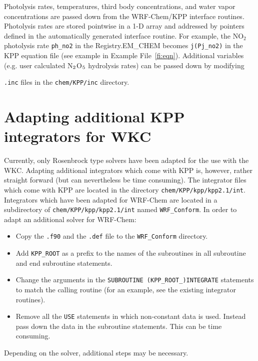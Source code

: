 \documentclass[twoside, 12pt, letterpaper]{article}
\begin{document}
Photolysis rates, temperatures, third body concentrations, and water vapor concentrations are passed down from the WRF-Chem/KPP interface routines. Photolysis rates are stored pointwise in a 1-D array and addressed by pointers defined in the automatically generated interface routine. For example, the NO$_2$ photolysis rate {\tt ph\_no2} in the Registry.EM\_CHEM becomes {\tt j(Pj\_no2)} in the KPP equation file (see example in Example File~\ref{fi:eqn}).
Additional variables (e.g. user calculated N$\rm_2$O$\rm_5$ hydrolysis rates) can be passed down by modifying {{\tt .inc} files in the {\tt chem/KPP/inc} directory.






\section{Adapting additional KPP integrators for WKC}\label{sec:add_int}
Currently, only Rosenbrock type solvers have been adapted for the use 
with the WKC. Adapting additional integrators which come
with KPP is, however, rather straight forward (but can nevertheless be time consuming). The integrator files which
come with KPP are located in the directory {\tt chem/KPP/kpp/kpp2.1/int}.
Integrators which have been adapted for WRF-Chem are located in a subdirectory 
of {\tt chem/KPP/kpp/kpp2.1/int} named {\tt WRF\_Conform}. In order to adapt an additional solver for WRF-Chem:
\begin{itemize}
\item Copy the {\tt .f90} and the {\tt .def} file to the {\tt WRF\_Conform} directory. 
\item Add {\tt KPP\_ROOT} as a prefix to the names of the subroutines in all subroutine and end subroutine statements. 
\item Change the arguments in the {\tt SUBROUTINE (KPP\_ROOT\_)INTEGRATE} statements to match the calling routine (for an example, see the existing integrator routines).
\item Remove all the {\tt USE} statements in which non-constant data is used. Instead pass down the data in the subroutine statements. This can be time consuming.
\end{itemize}

Depending on the solver, additional steps may be necessary.


}
\end{document}
